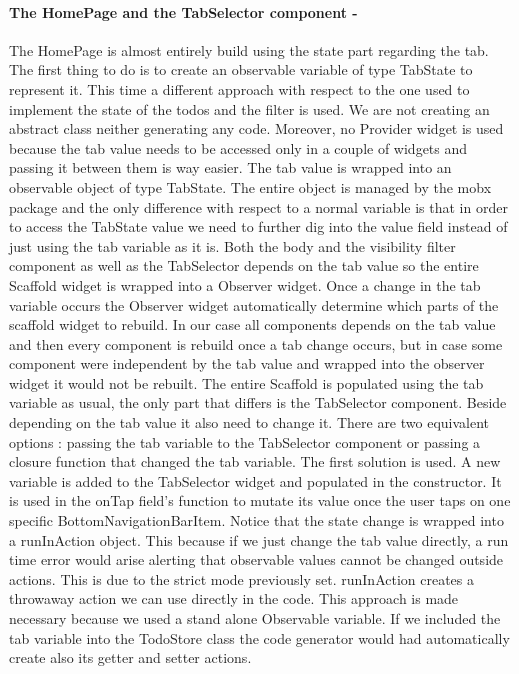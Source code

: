 \paragraph{The HomePage and the TabSelector component - }
\label{subpar:todo_app_bloc_core_state}The HomePage is almost entirely build using the state part regarding the tab. The first thing to do is to create an observable variable of type TabState to represent it. This time a different approach with respect to the one used to implement the state of the todos and the filter is used. We are not creating an abstract class neither generating any code. Moreover, no Provider widget is used because the tab value needs to be accessed only in a couple of widgets and passing it between them is way easier. The tab value is wrapped into an observable object of type TabState. The entire object is managed by the mobx package and the only difference with respect to a normal variable is that in order to access the TabState value we need to further dig into the value field instead of just using the tab variable as it is. Both the body and the visibility filter component as well as the TabSelector depends on the tab value so the entire Scaffold widget is wrapped into a Observer widget. Once a change in the tab variable occurs the Observer widget automatically determine which parts of the scaffold widget to rebuild. In our case all components depends on the tab value and then every component is rebuild once a tab change occurs, but in case some component were independent by the tab value and wrapped into the observer widget it would not be rebuilt. The entire Scaffold is populated using the tab variable as usual, the only part that differs is the TabSelector component. Beside depending on the tab value it also need to change it. There are two equivalent options : passing the tab variable to the TabSelector component or passing a closure function that changed the tab variable. The first solution is used. A new variable is added to the TabSelector widget and populated in the constructor. It is used in the onTap field’s function to mutate its value once the user taps on one specific BottomNavigationBarItem. Notice that the state change is wrapped into a runInAction object. This because if we just change the tab value directly, a run time error would arise alerting that observable values cannot be changed outside actions. This is due to the strict mode previously set. runInAction creates a throwaway action we can use directly in the code. This approach is made necessary because we used a stand alone Observable variable. If we included the tab variable into the TodoStore class the code generator would had automatically create also its getter and setter actions.
